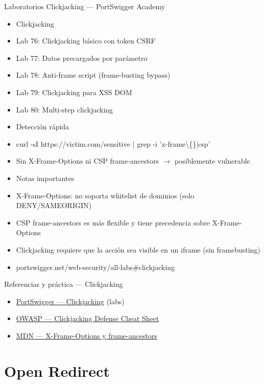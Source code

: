 \documentclass[aspectratio=169,10pt]{beamer}
\newcommand{\cmdbox}[1]{%
  \begin{center}%
  {\setlength{\fboxsep}{6pt}\colorbox{uzlav!40}{\parbox{0.88\linewidth}{\ttfamily\footnotesize #1}}}%
  \end{center}}
\begin{document}
\begin{frame}[allowframebreaks]{Laboratorios Clickjacking --- PortSwigger Academy}
\small
  \begin{itemize}
  \item Clickjacking
  \item Lab 76: Clickjacking básico con token CSRF
  \item Lab 77: Datos precargados por parámetro
  \item Lab 78: Anti-frame script (frame-busting bypass)
  \item Lab 79: Clickjacking para XSS DOM
  \item Lab 80: Multi-step clickjacking
  \item Detección rápida
  \item[] \cmdbox{curl -sI https://victim.com/sensitive | grep -i 'x-frame\textbackslash\{\}|csp'}
  \item Sin X-Frame-Options ni CSP frame-ancestors $\rightarrow$ posiblemente vulnerable
  \item Notas importantes
  \item X-Frame-Options: no soporta whitelist de dominios (solo DENY/SAMEORIGIN)
  \item CSP frame-ancestors es más flexible y tiene precedencia sobre X-Frame-Options
  \item Clickjacking requiere que la acción sea visible en un iframe (sin framebusting)
  \item portswigger.net/web-security/all-labs\#clickjacking
  \end{itemize}
\end{frame}

\begin{frame}{Referencias y práctica --- Clickjacking}
\footnotesize
  \begin{itemize}
  \item \href{https://portswigger.net/web-security/clickjacking}{PortSwigger --- Clickjacking} (labs)
  \item \href{https://cheatsheetseries.owasp.org/cheatsheets/Clickjacking_Defense_Cheat_Sheet.html}{OWASP --- Clickjacking Defense Cheat Sheet}
  \item \href{https://developer.mozilla.org/en-US/docs/Web/HTTP/Headers/X-Frame-Options}{MDN --- X-Frame-Options y frame-ancestors}
  \end{itemize}
\end{frame}

\section{Open Redirect}
\end{document}

